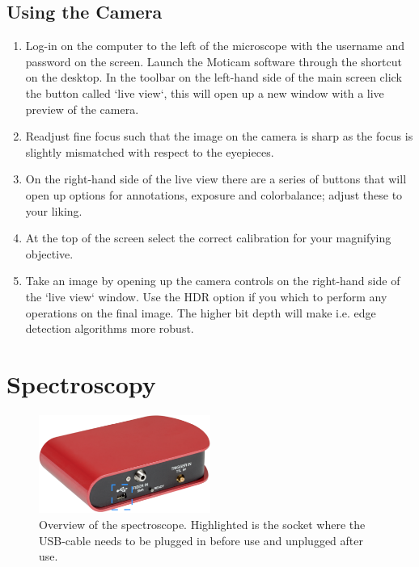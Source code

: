 \documentclass[a4paper]{scrartcl}
\begin{document}
\subsection*{Using the Camera}
\begin{enumerate}
	\item Log-in on the computer to the left of the microscope with the username and password on the screen. Launch the Moticam software through the shortcut on the desktop. In the toolbar on the left-hand side of the main screen click the button called `live view`, this will open up a new window with a live preview of the camera.
	\item Readjust fine focus such that the image on the camera is sharp as the focus is slightly mismatched with respect to the eyepieces.
	\item On the right-hand side of the live view there are a series of buttons that will open up options for annotations, exposure and colorbalance; adjust these to your liking.
	\item At the top of the screen select the correct calibration for your magnifying objective.
	\item Take an image by opening up the camera controls on the right-hand side of the `live view` window. Use the HDR option if you which to perform any operations on the final image. The higher bit depth will make i.e. edge detection algorithms more robust.
\end{enumerate}

\section*{Spectroscopy}
\begin{figure}[h]
\begin{center}
	\includegraphics[width=0.5\textwidth, keepaspectratio]{figures/spectroscope.png}
\end{center}
\caption{Overview of the spectroscope. Highlighted is the socket where the USB-cable needs to be plugged in before use and unplugged after use.}
\label{fig:spectroscope}
\end{figure}
\end{document}
